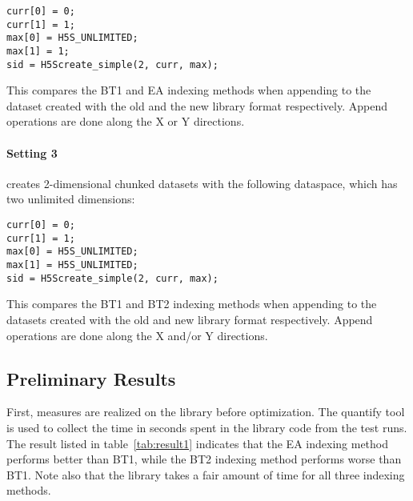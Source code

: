 {
\begin{lstlisting}
curr[0] = 0;
curr[1] = 1;
max[0] = H5S_UNLIMITED;
max[1] = 1;
sid = H5Screate_simple(2, curr, max);
\end{lstlisting}
}

This compares the BT1 and EA indexing methods when appending to the dataset
created with the old and the new library format respectively.
Append operations are done along the X or Y directions.

\paragraph{Setting 3} creates 2-dimensional chunked datasets with the following
dataspace, which has two unlimited dimensions:

{
\begin{lstlisting}
curr[0] = 0;
curr[1] = 1;
max[0] = H5S_UNLIMITED;
max[1] = H5S_UNLIMITED;
sid = H5Screate_simple(2, curr, max);
\end{lstlisting}
}

This compares the BT1 and BT2 indexing methods when appending to the
datasets created with the old and new library format respectively.
Append operations are done along the X and/or Y directions.

\subsection{Preliminary Results}

First, measures are realized on the library before optimization.
The quantify tool is used to collect the time in seconds spent in the library
code from the test runs. The result listed in table~\ref{tab:result1} indicates
that the EA indexing method performs better than BT1, while the BT2 indexing
method performs worse than BT1. Note also that the library takes a fair amount
of time for all three indexing methods.

